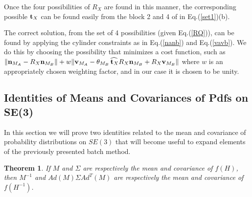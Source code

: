 \documentclass[twocolumn,10pt]{asme2ej}
\newtheorem{theorem}{Theorem}[section]
\begin{document}
Once the four possibilities of $R_X$ are found in this manner, the corresponding possible ${\bf t}_X$ can be found easily from the block 2 and 4 of in Eq.(\ref{set1})(b).

The correct solution, from the set of 4 possibilities (given Eq.(\ref{RQ})), can be found by applying the cylinder constraints as in Eq.(\ref{nanb}) and Eq.(\ref{vavb}). We do this by choosing the possibility that minimizes a cost function, such as $\| {\bf n}_{M_A}-R_X {\bf n}_{M_B} \|+w \| {\bf v}_{M_A} - \theta_{M_B} \widehat{\,{\bf t}_X} R_X {\bf n}_{M_B} + R_X {\bf v}_{M_B} \|$
where $w$ is an appropriately chosen weighting factor, and in our case it is chosen to be unity.

\subsection{Identities of Means and Covariances of Pdfs on SE(3)}
In this section we will prove two identities related to the mean and covariance of probability distributions on $SE(3)$ that will become useful to expand elements of the previously presented batch method.

\begin{theorem} \label{thm1}
If $M$ and $\Sigma$ are respectively the mean and covariance of $f(H)$, then
$M^{-1}$ and $Ad(M) \Sigma Ad^T(M)$ are respectively the mean and covariance of $f(H^{-1})$.
\end{theorem}
\end{document}

